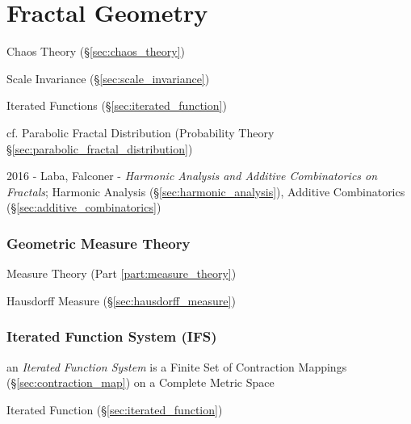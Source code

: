 \part{Fractal Geometry}\label{sec:fractal_geometry}

Chaos Theory (\S\ref{sec:chaos_theory})

Scale Invariance (\S\ref{sec:scale_invariance})

Iterated Functions (\S\ref{sec:iterated_function})

cf. Parabolic Fractal Distribution (Probability Theory
\S\ref{sec:parabolic_fractal_distribution})

2016 - Laba, Falconer - \emph{Harmonic Analysis and Additive Combinatorics on
  Fractals}; Harmonic Analysis (\S\ref{sec:harmonic_analysis}), Additive
Combinatorics (\S\ref{sec:additive_combinatorics})



\section{Geometric Measure Theory}\label{sec:geometric_measure_theory}

\fist Measure Theory (Part \ref{part:measure_theory})

\fist Hausdorff Measure (\S\ref{sec:hausdorff_measure})



\section{Iterated Function System (IFS)}\label{sec:ifs}

an \emph{Iterated Function System} is a Finite Set of Contraction Mappings
(\S\ref{sec:contraction_map}) on a Complete Metric Space

Iterated Function (\S\ref{sec:iterated_function})

